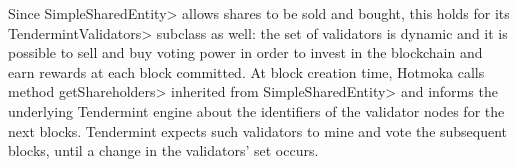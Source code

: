 Since \<SimpleSharedEntity> allows shares to be sold and bought, this holds for
its \<TendermintValidators> subclass as well: the set of validators
is dynamic and it is possible to sell and buy voting power in order to invest in the blockchain
and earn rewards at each block committed. At block creation time,
Hotmoka calls method \<getShareholders> inherited from
\<SimpleSharedEntity> and informs the
underlying Tendermint engine about the identifiers of the validator nodes for the next blocks.
Tendermint expects such validators to mine and vote the subsequent blocks, until a change in the
validators' set occurs.

